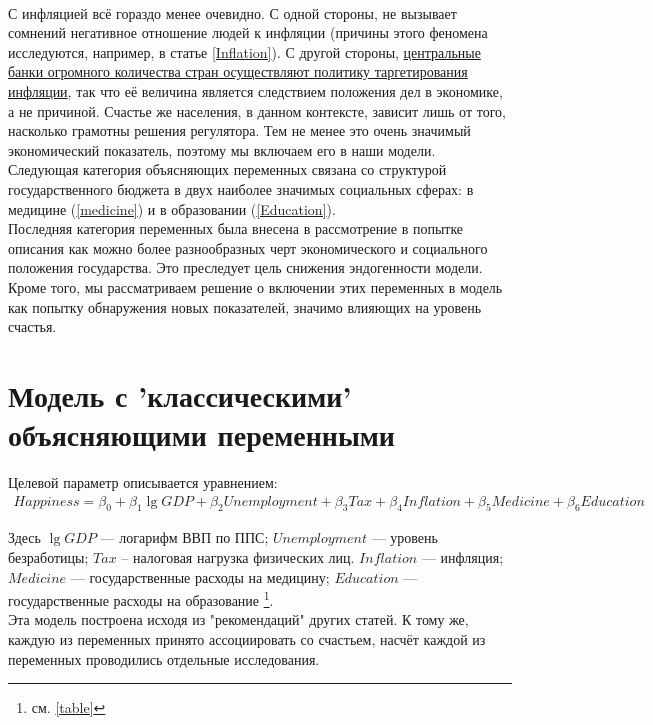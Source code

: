 \documentclass[russian]{vegareport}
\begin{document}
        \\
        С инфляцией всё гораздо менее очевидно. С одной стороны, не вызывает сомнений негативное отношение людей к инфляции (причины этого феномена исследуются, например, в статье \ref{Inflation}). С другой стороны, \href{http://www.centralbanknews.info/p/inflation-targets.html}{центральные банки огромного количества стран осуществляют политику таргетирования инфляции}, так что её величина является следствием положения дел в экономике, а не причиной. Счастье же населения, в данном контексте, зависит лишь от того, насколько грамотны решения регулятора. Тем не менее это очень значимый экономический показатель, поэтому мы включаем его в наши модели.
        \\
        Следующая категория объясняющих переменных связана со структурой государственного бюджета в двух наиболее значимых социальных сферах: в медицине (\ref{medicine}) и в образовании (\ref{Education}).
        \\
        Последняя категория переменных была внесена в рассмотрение в попытке описания как можно более разнообразных черт экономического и социального положения государства. Это преследует цель снижения эндогенности модели. Кроме того, мы рассматриваем решение о включении этих переменных в модель как попытку обнаружения новых показателей, значимо влияющих на уровень счастья.

        \section{Модель с 'классическими' объясняющими переменными}
        Целевой параметр описывается уравнением:
        \begin{align*}
        Happiness = \beta_0 + \beta_1 \lg{GDP} + \beta_2 Unemployment + \beta_3 Tax + \beta_4 Inflation + \beta_5 Medicine + \beta_6 Education
        \end{align*}

        Здесь $\lg{GDP}$ --- логарифм ВВП по ППС; $Unemployment$ --- уровень безработицы; $Tax$ -- налоговая нагрузка физических лиц. $Inflation$ --- инфляция; $Medicine$ --- государственные расходы на медицину; $Education$ --- государственные расходы на образование \footnote{см. \ref{table}}.
        \\
        Эта модель построена исходя из "рекомендаций" других статей. К тому же, каждую из переменных принято ассоциировать со счастьем, насчёт каждой из переменных проводились отдельные исследования.
\end{document}
